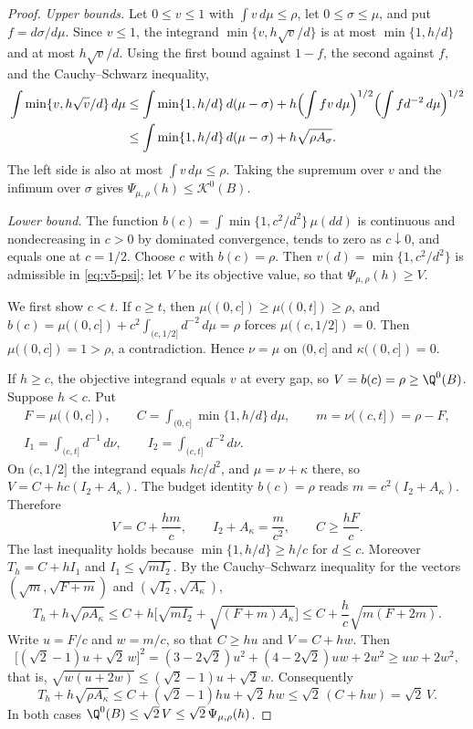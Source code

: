\begin{proof}
\emph{Upper bounds.} Let $0\le v\le1$ with $\int v\,d\mu\le\rho$, let
$0\le\sigma\le\mu$, and put $f=d\sigma/d\mu$. Since $v\le1$, the
integrand $\min\{v,h\sqrt v/d\}$ is at most $\min\{1,h/d\}$ and at most
$h\sqrt v/d$. Using the first bound against $1-f$, the second against
$f$, and the Cauchy--Schwarz inequality,
\begin{align*}
 \int\min\{v,h\sqrt v/d\}\,d\mu
 &\le\int\min\{1,h/d\}\,d(\mu-\sigma)
   +h\Bigl(\int fv\,d\mu\Bigr)^{1/2}\Bigl(\int fd^{-2}\,d\mu\Bigr)^{1/2}\\
 &\le\int\min\{1,h/d\}\,d(\mu-\sigma)+h\sqrt{\rho A_\sigma}.
\end{align*}
The left side is also at most $\int v\,d\mu\le\rho$. Taking the supremum
over $v$ and the infimum over $\sigma$ gives
$\Psi_{\mu,\rho}(h)\le\mathcal K^0(B)$.

\emph{Lower bound.} The function
$b(c)=\int\min\{1,c^2/d^2\}\,\mu(dd)$ is continuous and nondecreasing in
$c>0$ by dominated convergence, tends to zero as $c\downarrow0$, and
equals one at $c=1/2$. Choose $c$ with $b(c)=\rho$. Then
$v(d)=\min\{1,c^2/d^2\}$ is admissible in \eqref{eq:v5-psi}; let $V$ be
its objective value, so that $\Psi_{\mu,\rho}(h)\ge V$.

We first show $c<t$. If $c\ge t$, then $\mu((0,c])\ge\mu((0,t])\ge\rho$,
and $b(c)=\mu((0,c])+c^2\int_{(c,1/2]}d^{-2}\,d\mu=\rho$ forces
$\mu((c,1/2])=0$. Then $\mu((0,c])=1>\rho$, a contradiction. Hence
$\nu=\mu$ on $(0,c]$ and $\kappa((0,c])=0$.

If $h\ge c$, the objective integrand equals $v$ at every gap, so
$V=b(c)=\rho\ge\Q^0(B)$. Suppose $h<c$. Put
\begin{gather*}
 F=\mu((0,c]),\qquad C=\int_{(0,c]}\min\{1,h/d\}\,d\mu,\qquad
 m=\nu((c,t])=\rho-F,\\
 I_1=\int_{(c,t]}d^{-1}\,d\nu,\qquad I_2=\int_{(c,t]}d^{-2}\,d\nu .
\end{gather*}
On $(c,1/2]$ the integrand equals $hc/d^2$, and $\mu=\nu+\kappa$ there,
so $V=C+hc(I_2+A_\kappa)$. The budget identity $b(c)=\rho$ reads
$m=c^2(I_2+A_\kappa)$. Therefore
\[
 V=C+\frac{hm}{c},\qquad I_2+A_\kappa=\frac{m}{c^2},\qquad
 C\ge\frac{hF}{c}.
\]
The last inequality holds because $\min\{1,h/d\}\ge h/c$ for
$d\le c$. Moreover $T_h=C+hI_1$ and $I_1\le\sqrt{mI_2}$. By the
Cauchy--Schwarz inequality for the vectors
$(\sqrt m,\sqrt{F+m})$ and $(\sqrt{I_2},\sqrt{A_\kappa})$,
\[
 T_h+h\sqrt{\rho A_\kappa}
 \le C+h\bigl[\sqrt{mI_2}+\sqrt{(F+m)A_\kappa}\bigr]
 \le C+\frac{h}{c}\sqrt{m(F+2m)} .
\]
Write $u=F/c$ and $w=m/c$, so that $C\ge hu$ and $V=C+hw$. Then
\[
 \bigl[(\sqrt2-1)u+\sqrt2\,w\bigr]^2
 =(3-2\sqrt2)u^2+(4-2\sqrt2)uw+2w^2\ge uw+2w^2 ,
\]
that is, $\sqrt{w(u+2w)}\le(\sqrt2-1)u+\sqrt2\,w$. Consequently
\[
 T_h+h\sqrt{\rho A_\kappa}\le C+(\sqrt2-1)hu+\sqrt2\,hw
 \le\sqrt2\,(C+hw)=\sqrt2\,V .
\]
In both cases $\Q^0(B)\le\sqrt2\,V\le\sqrt2\,\Psi_{\mu,\rho}(h)$.


\end{proof}
